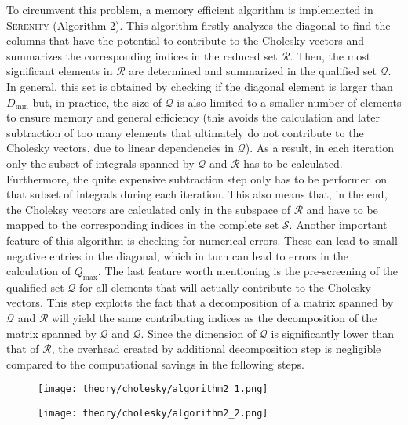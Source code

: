 To circumvent this problem, a memory efficient algorithm is implemented in \textsc{Serenity} (Algorithm 2). This algorithm firstly analyzes the diagonal to find the columns that have the potential to contribute to the Cholesky vectors and summarizes the corresponding indices in the reduced set $\mathcal{R}$. Then, the most significant elements in $\mathcal{R}$ are determined and summarized in the qualified set $\mathcal{Q}$. In general, this set is obtained by checking if the diagonal element is larger than $D_\text{min}$ but, in practice, the size of $\mathcal{Q}$ is also limited to a smaller number of elements to ensure memory and general efficiency (this avoids the calculation and later subtraction of too many elements that ultimately do not contribute to the Cholesky vectors, due to linear dependencies in $\mathcal{Q}$). As a result, in each iteration only the subset of integrals spanned by $\mathcal{Q}$ and $\mathcal{R}$ has to be calculated. Furthermore, the quite expensive subtraction step only has to be performed on that subset of integrals during each iteration. This also means that, in the end, the Choleksy vectors are calculated only in the subspace of $\mathcal{R}$ and have to be mapped to the corresponding indices in the complete set $\mathcal{S}$. Another important feature of this algorithm is checking for numerical errors. These can lead to small negative entries in the diagonal, which in turn can lead to errors in the calculation of $Q_{\text{max}}$. The last feature worth mentioning is the pre-screening of the qualified set $\mathcal{Q}$ for all elements that will actually contribute to the Cholesky vectors. This step exploits the fact that a decomposition of a matrix spanned by $\mathcal{Q}$ and $\mathcal{R}$ will yield the same contributing indices as the decomposition of the matrix spanned by $\mathcal{Q}$ and $\mathcal{Q}$. Since the dimension of $\mathcal{Q}$ is significantly lower than that of $\mathcal{R}$, the overhead created by additional decomposition step is negligible compared to the computational savings in the following steps.

\begin{figure}
	\texttt{[image: theory/cholesky/algorithm2\_1.png]}
\end{figure}

\begin{figure}
	\texttt{[image: theory/cholesky/algorithm2\_2.png]}
\end{figure}



